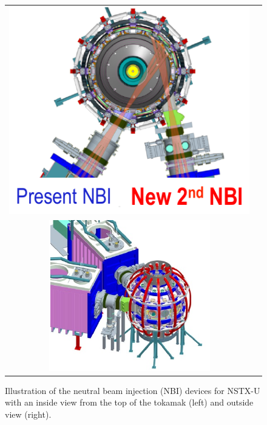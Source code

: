 \documentclass[12pt]{iopart}
\begin{document}
\begin{figure}
\begin{tabular}{cc}
\includegraphics[width=\linewidth]{imene_figs/pic_NBI1} \\
\includegraphics[width=\linewidth]{imene_figs/pic_NBI2}
\end{tabular}
\caption{Illustration of the neutral beam injection (NBI) devices for NSTX-U with an inside view from the top of the tokamak (left) and outside view (right). }
\label{NBI_pics}
\end{figure}
\end{document}
